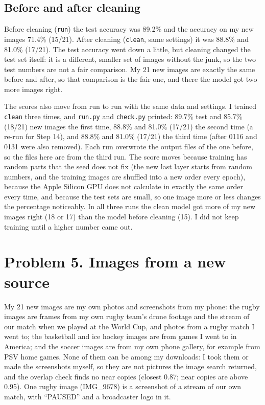 \documentclass[11pt]{article}
\begin{document}
\subsection*{Before and after cleaning}

\begin{center}
\hfill
{}
\end{center}

Before cleaning (\texttt{run}) the test accuracy was 89.2\% and the accuracy on my
new images 71.4\% (15/21). After cleaning (\texttt{clean}, same settings) it was
88.8\% and 81.0\% (17/21). The test accuracy went down a little, but cleaning
changed the test set itself: it is a different, smaller set of images without
the junk, so the two test numbers are not a fair comparison. My 21 new images are
exactly the same before and after, so that comparison is the fair one, and there
the model got two more images right.

The scores also move from run to run with the same data and settings. I trained
\texttt{clean} three times, and \texttt{run.py} and \texttt{check.py} printed:
89.7\% test and 85.7\% (18/21) new images the first time, 88.8\% and 81.0\%
(17/21) the second time (a re-run for Step 14), and 88.8\% and 81.0\% (17/21)
the third time (after 0116 and 0131 were also removed). Each run overwrote the
output files of the one before, so the files here are from the third run. The
score moves because training has random parts that the seed does not fix (the new
last layer starts from random numbers, and the training images are shuffled into
a new order every epoch), because the Apple Silicon GPU does not calculate in
exactly the same order every time, and because the test sets are small, so one
image more or less changes the percentage noticeably. In all three runs the clean
model got more of my new images right (18 or 17) than the model before cleaning
(15). I did not keep training until a higher number came out.

\section*{Problem 5. Images from a new source}

My 21 new images are my own photos and screenshots from my phone: the rugby
images are frames from my own rugby team's drone footage and the stream of our
match when we played at the World Cup, and photos from a rugby match I went to;
the basketball and ice hockey images are from games I went to in America; and the
soccer images are from my own phone gallery, for example from PSV home games.
None of them can be among my downloads: I took them or made the screenshots
myself, so they are not pictures the image search returned, and the overlap check
finds no near copies (closest 0.87; near copies are above 0.95). One rugby image
(IMG\_9678) is a screenshot of a stream of our own match, with ``PAUSED'' and a
broadcaster logo in it.
\end{document}
